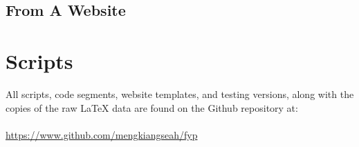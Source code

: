 \documentclass[main.tex]{subfiles}
\begin{document}
\subsection{From A Website}

\section{Scripts}\label{sec:appendix-repo}
All scripts, code segments, website templates, and testing versions, along with the copies of the raw \LaTeX{} data are found on the Github repository at:
\\\\
\url{https://www.github.com/mengkiangseah/fyp}
\end{document}
